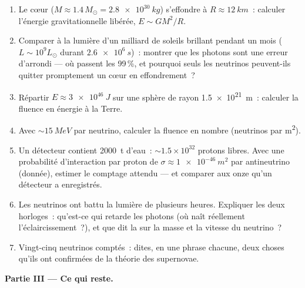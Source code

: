 \begin{problem}
\begin{enumerate}[resume]
  \item Le cœur ($M \approx 1.4\,M_\odot = \qty{2.8e30}{kg}$)
        s'effondre à $R \approx \qty{12}{km}$~: calculer l'énergie
        gravitationnelle libérée, $E \sim GM^2/R$.
  \item Comparer à la lumière d'un milliard de soleils brillant
        pendant un mois ($L \sim 10^{9}L_\odot$ durant
        $\qty{2.6e6}{s}$)~: montrer que les photons sont une erreur
        d'arrondi --- où passent les 99\,\%, et pourquoi seuls les
        neutrinos peuvent-ils quitter promptement un cœur en
        effondrement~?
  \item Répartir $E \approx \qty{3e46}{J}$ sur une sphère de
        rayon \qty{1.5e21}{m}~: calculer la fluence en énergie à la
        Terre.
  \item Avec $\sim\qty{15}{MeV}$ par neutrino, calculer la fluence
        en nombre (neutrinos par \unit{m^2}).
  \item Un détecteur contient \qty{2000}{t} d'eau~:
        ${\sim}1.5\times10^{32}$ protons libres. Avec une
        probabilité d'interaction par proton de
        $\sigma \approx \qty{1e-46}{m^2}$ par antineutrino
        (donnée), estimer le comptage attendu --- et comparer aux
        onze qu'un détecteur a enregistrés.
  \item Les neutrinos ont battu la lumière de plusieurs heures.
        Expliquer les deux horloges~: qu'est-ce qui retarde les
        photons (où naît réellement l'éclaircissement~?), et que dit
        la  sur la masse et la vitesse du
        neutrino~?
  \item Vingt-cinq neutrinos comptés~: dites, en une phrase
        chacune, deux choses qu'ils ont confirmées de la théorie des
        supernovae.
\end{enumerate}

\medskip\noindent\textbf{Partie III --- Ce qui reste.}


\end{problem}
